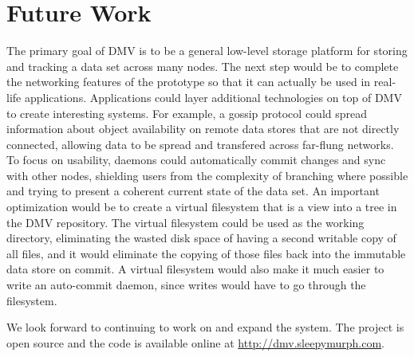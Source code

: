 \section{Future Work}

The primary goal of DMV is to be a general low-level storage platform for
storing and tracking a data set across many nodes. The next step would be to
complete the networking features of the prototype so that it can actually be
used in real-life applications. Applications could layer additional technologies
on top of DMV to create interesting systems. For example, a gossip protocol
could spread information about object availability on remote data stores that
are not directly connected, allowing data to be spread and transfered across
far-flung networks. To focus on usability, daemons could automatically commit
changes and sync with other nodes, shielding users from the complexity of
branching where possible and trying to present a coherent current state of the
data set. An important optimization would be to create a virtual filesystem that
is a view into a tree in the DMV repository. The virtual filesystem could be
used as the working directory, eliminating the wasted disk space of having a
second writable copy of all files, and it would eliminate the copying of those
files back into the immutable data store on commit. A virtual filesystem would
also make it much easier to write an auto-commit daemon, since writes would have
to go through the filesystem.

We look forward to continuing to work on and expand the system. The project is
open source and the code is available online at
\url{http://dmv.sleepymurph.com}.
